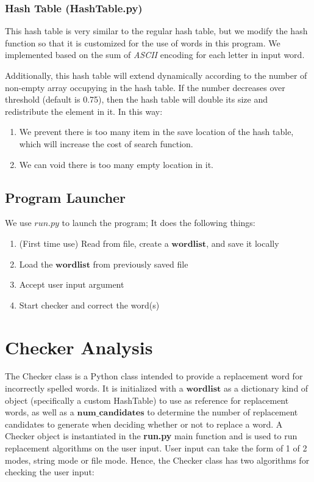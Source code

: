 \documentclass[10pt]{article}
\theoremstyle{definition}
\begin{document}
\subsubsection{Hash Table (HashTable.py)}
This hash table is very similar to the regular hash table, but we modify the hash function so that it is customized for the use of words in this program. We implemented based on the sum of \textit{ASCII} encoding for each letter in input word.

Additionally, this hash table will extend dynamically according to the number of non-empty array occupying in the hash table. If the number decreases over threshold (default is 0.75), then the hash table will double its size and redistribute the element in it. In this way:
\begin{enumerate}
    \item We prevent there is too many item in the save location of the hash table, which will increase the cost of search function.
    \item We can void there is too many empty location in it.
\end{enumerate}

\subsection{Program Launcher}

We use $run.py$ to launch the program; It does the following things:
\begin{enumerate}
    \item (First time use) Read from file, create a $\textbf{wordlist}$, and save it locally
    \item Load the $\textbf{wordlist}$ from previously saved file
    \item Accept user input argument
    \item Start checker and correct the word(s)
\end{enumerate}


\section{Checker Analysis}
The Checker class is a Python class intended to provide a replacement word for incorrectly spelled words. It is initialized with a $\textbf{wordlist}$ as a dictionary kind of object (specifically a custom HashTable) to use as reference for replacement words, as well as a $\textbf{num\_candidates}$ to determine the number of replacement candidates to generate when deciding whether or not to replace a word.
\newline
\newline
A Checker object is instantiated in the \textbf{run.py} main function and is used to run replacement algorithms on the user input. User input can take the form of 1 of 2 modes, string mode or file mode. Hence, the Checker class has two algorithms for checking the user input:
\end{document}
